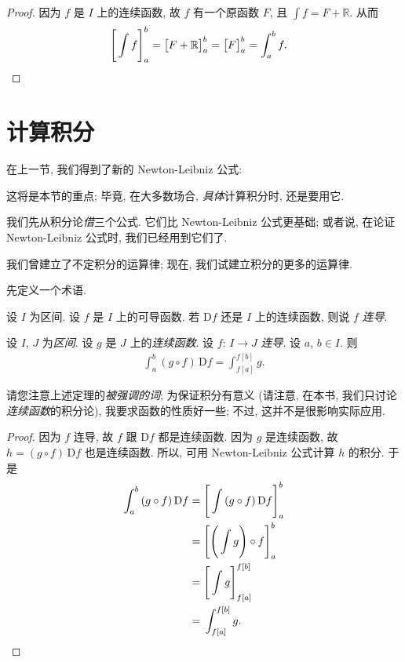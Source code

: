 \begin{proof}
    因为 $f$ 是 $I$ 上的连续函数,
    故 $f$ 有一个原函数 $F$,
    且 $\int {f} = F + \mathbb{R}$.
    从而
    \begin{align*}
         & \Bigg[ \int {f} \Bigg]_{a}^{b}
        = \big[ F + \mathbb{R} \big]_{a}^{b}
        = \big[ F \big]_{a}^{b}
        = \int_{a}^{b} {f}. \qedhere
    \end{align*}
\end{proof}

\section{计算积分}

在上一节, 我们得到了新的 Newton-Leibniz 公式:

\NewNewtonLeibniz*

这将是本节的重点;
毕竟, 在大多数场合, \emph{具体}计算积分时, 还是要用它.

我们先从积分论\emph{借}三个公式.
它们比 Newton-Leibniz 公式更基础;
或者说, 在论证 Newton-Leibniz 公式时, 我们已经用到它们了.

\LinearityOfInegrals*

\AdditivityOfIntervalsOfIntegrals*

我们曾建立了不定积分的运算律;
现在, 我们试建立积分的更多的运算律.

先定义一个术语.

\begin{definition}
    设 $I$ 为区间.
    设 $f$ 是 $I$ 上的可导函数.
    若 $\mathrm{D}f$ 还是 $I$ 上的连续函数,
    则说 $f$ \emph{连导}.
\end{definition}

\begin{theorem}
    设 $I$, $J$ 为\emph{区间}.
    设 $g$ 是 $J$ 上的\emph{连续函数}.
    设 $f$: $I \to J$ \emph{连导}.
    设 $a$, $b \in I$.
    则
    \begin{align*}
        \int_{a}^{b} {(g \circ f)\,\mathrm{D}f} = \int_{f[a]}^{f[b]} {g}.
    \end{align*}
\end{theorem}

请您注意上述定理的\emph{被强调的词};
为保证积分有意义
(请注意, 在本书, 我们只讨论\emph{连续函数}的积分论),
我要求函数的性质好一些;
不过, 这并不是很影响实际应用.

\begin{proof}
    因为 $f$ 连导, 故 $f$ 跟 $\mathrm{D}f$ 都是连续函数.
    因为 $g$ 是连续函数,
    故 $h = (g \circ f)\,\mathrm{D}f$ 也是连续函数.
    所以, 可用 Newton-Leibniz 公式计算 $h$ 的积分.
    于是
    \begin{align*}
        \int_{a}^{b} {(g \circ f)\,\mathrm{D}f}
        = {} & \Bigg[ \int {(g \circ f)\,\mathrm{D}f} \Bigg]_{a}^{b} \\
        = {} & \Bigg[ \Bigg( \int {g} \Bigg) \circ f \Bigg]_{a}^{b}  \\
        = {} & \Bigg[ \int {g} \Bigg]_{f[a]}^{f[b]}                  \\
        = {} & \int_{f[a]}^{f[b]} {g}. \qedhere
    \end{align*}
\end{proof}

